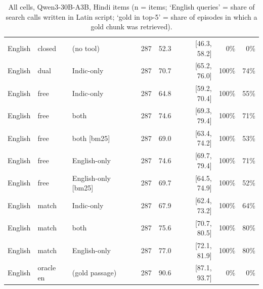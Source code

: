 \begin{table}[h]
\begin{tabular}{lllrrrrr}
English & closed & (no tool) & 287 & 52.3 & [46.3, 58.2] & 0\% & 0\% \\
English & dual & Indic-only & 287 & 70.7 & [65.2, 76.0] & 100\% & 74\% \\
English & free & Indic-only & 287 & 64.8 & [59.2, 70.4] & 100\% & 55\% \\
English & free & both & 287 & 74.6 & [69.3, 79.4] & 100\% & 71\% \\
English & free & both [bm25] & 287 & 69.0 & [63.4, 74.2] & 100\% & 53\% \\
English & free & English-only & 287 & 74.6 & [69.7, 79.4] & 100\% & 71\% \\
English & free & English-only [bm25] & 287 & 69.7 & [64.5, 74.9] & 100\% & 52\% \\
English & match & Indic-only & 287 & 67.9 & [62.4, 73.2] & 100\% & 64\% \\
English & match & both & 287 & 75.6 & [70.7, 80.5] & 100\% & 80\% \\
English & match & English-only & 287 & 77.0 & [72.1, 81.9] & 100\% & 80\% \\
English & oracle en & (gold passage) & 287 & 90.6 & [87.1, 93.7] & 0\% & 0\% \\
\bottomrule
\end{tabular}
\caption{All cells, Qwen3-30B-A3B, Hindi items (n = items; `English queries' = share of search calls written in Latin script; `gold in top-5' = share of episodes in which a gold chunk was retrieved).}
\end{table}

